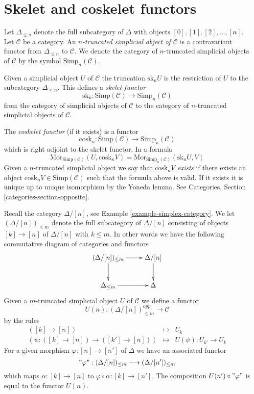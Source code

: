 \section{Skelet and coskelet functors}
\label{section-skelet}

\noindent
Let $\Delta_{\leq n}$ denote the full subcategory of
$\Delta$ with objects $[0], [1], [2], \ldots, [n]$.
Let $\mathcal{C}$ be a category.
An {\it $n$-truncated simplicial object of $\mathcal{C}$} 
is a contravariant functor from $\Delta_{\leq n}$ to
$\mathcal{C}$.
We denote the category of $n$-truncated
simplicial objects of $\mathcal{C}$ by
the symbol $\text{Simp}_n(\mathcal{C})$.

\medskip\noindent
Given a simplicial object $U$ of $\mathcal{C}$
the truncation $\text{sk}_n U$ is the restriction
of $U$ to the subcategory $\Delta_{\leq n}$.
This defines a {\it skelet functor}
$$
\text{sk}_n :
\text{Simp}(\mathcal{C}) \longrightarrow \text{Simp}_n(\mathcal{C})
$$
from the category of simplicial objects of $\mathcal{C}$
to the category of $n$-truncated simplicial objects of $\mathcal{C}$.

\medskip\noindent
The {\it coskelet functor} (if it exists) is a functor
$$
\text{cosk}_n :
\text{Simp}(\mathcal{C}) \longrightarrow \text{Simp}_n(\mathcal{C})
$$
which is right adjoint to the skelet functor. In a formula
$$
\text{Mor}_{\text{Simp}(\mathcal{C})}(U, \text{cosk}_n V)
=
\text{Mor}_{\text{Simp}_n(\mathcal{C})}(\text{sk}_n U, V)
$$
Given a $n$-truncated simplicial object we 
say that {\it $\text{cosk}_nV$ exists} if there
exists an object $\text{cosk}_nV \in \text{Simp}(\mathcal{C})$
such that the formula above is valid. If it exists it
is unique up to unique isomorphism by the Yoneda lemma.
See Categories, Section \ref{categories-section-opposite}.

\medskip\noindent
Recall the category $\Delta/[n]$, see Example \ref{example-simplex-category}.
We let $(\Delta/[n])_{\leq m}$ denote the full subcategory
of $\Delta/[n]$ consisting of objects $[k] \to [n]$
of $\Delta/[n]$ with $k \leq m$. In other words we have
the following commutative diagram of categories and functors
$$
\xymatrix{
(\Delta/[n])_{\leq m} \ar[r] \ar[d] &
\Delta/[n] \ar[d] \\
\Delta_{\leq m} \ar[r] &
\Delta
}
$$
Given a $m$-truncated
simplicial object $U$ of $\mathcal{C}$
we define a functor
$$
U(n) : (\Delta/[n])_{\leq m}^{opp} \longrightarrow \mathcal{C}
$$
by the rules
\begin{eqnarray*}
([k] \to [n]) & \longmapsto & U_k \\
(\psi : ([k] \to [n]) \to ([k'] \to [n])) &
\longmapsto &
U(\psi) : U_{k'} \to U_k
\end{eqnarray*}
For a given morphism $\varphi : [n] \to [n']$ of $\Delta$
we have an associated functor
$$
"\varphi" : (\Delta/[n])_{\leq m} \longrightarrow (\Delta/[n'])_{\leq m}
$$
which maps $\alpha : [k] \to [n]$ to
$\varphi \circ \alpha : [k] \to [n']$.
The composition $U(n') \circ "\varphi"$ is
equal to the functor $U(n)$.

